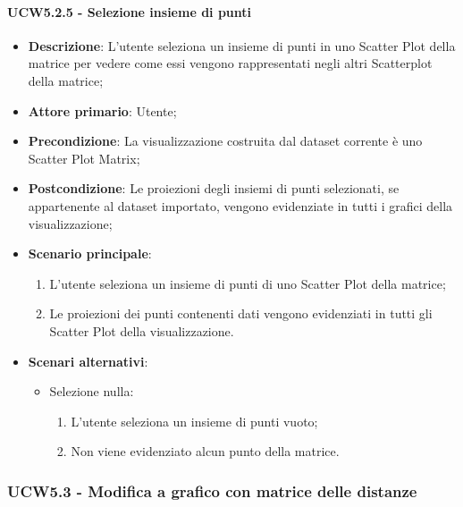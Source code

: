 \paragraph{UCW5.2.5 - Selezione insieme di punti}
\label{par:ucw5.2.5}
\begin{itemize}
    \item \textbf{Descrizione}: L'utente seleziona un insieme di punti in uno Scatter Plot della matrice per vedere come
                                essi vengono rappresentati negli altri Scatterplot della matrice;

    \item \textbf{Attore primario}: Utente;

    \item \textbf{Precondizione}:   La visualizzazione costruita dal dataset corrente è uno Scatter Plot Matrix;
    \item \textbf{Postcondizione}:  Le proiezioni degli insiemi di punti selezionati, se appartenente al dataset importato,
                                    vengono evidenziate in tutti i grafici della visualizzazione;

	\item \textbf{Scenario principale}:
        \begin{enumerate}
            \item L'utente seleziona un insieme di punti di uno Scatter Plot della matrice;
            \item Le proiezioni dei punti contenenti dati vengono evidenziati in tutti gli Scatter Plot della visualizzazione.
        \end{enumerate}

    \item \textbf{Scenari alternativi}:
    \begin{itemize}
        \item Selezione nulla:
        \begin{enumerate}
            \item L'utente seleziona un insieme di punti vuoto;
            \item Non viene evidenziato alcun punto della matrice.
        \end{enumerate}
    \end{itemize}    

\end{itemize}

\newpage
\subsubsection{UCW5.3 - Modifica a grafico con matrice delle distanze}
\label{ssub:ucw5.3}

